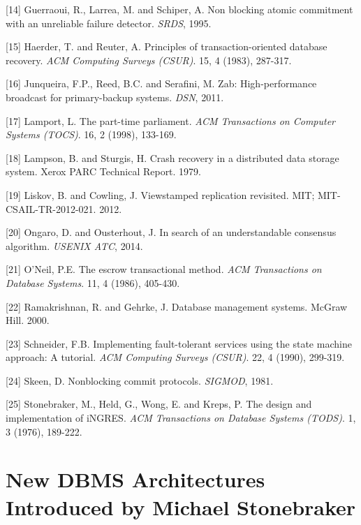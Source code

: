 \documentclass[b5paper,11pt,twoside,openright]{book}
\newcommand\Chapter[3]{
  \hypertarget{#1}{
    \chapter[#2]{#2\\{\Large #3}}\label{#1}
  }
}
\begin{document}
\leavevmode\hypertarget{ref-ac-srds}{}%
{[}14{]} Guerraoui, R., Larrea, M. and Schiper, A. Non blocking atomic
commitment with an unreliable failure detector. \emph{SRDS}, 1995.

\leavevmode\hypertarget{ref-haerder-reuter}{}%
{[}15{]} Haerder, T. and Reuter, A. Principles of transaction-oriented
database recovery. \emph{ACM Computing Surveys (CSUR)}. 15, 4 (1983),
287-317.

\leavevmode\hypertarget{ref-zab}{}%
{[}16{]} Junqueira, F.P., Reed, B.C. and Serafini, M. Zab:
High-performance broadcast for primary-backup systems. \emph{DSN}, 2011.

\leavevmode\hypertarget{ref-paxos}{}%
{[}17{]} Lamport, L. The part-time parliament. \emph{ACM Transactions on
  Computer Systems (TOCS)}. 16, 2 (1998), 133-169.

\leavevmode\hypertarget{ref-lampson-2pc}{}%
{[}18{]} Lampson, B. and Sturgis, H. Crash recovery in a distributed
data storage system. Xerox PARC Technical Report. 1979.

\leavevmode\hypertarget{ref-vrr}{}%
{[}19{]} Liskov, B. and Cowling, J. Viewstamped replication revisited.
MIT; MIT-CSAIL-TR-2012-021. 2012.

\leavevmode\hypertarget{ref-raft}{}%
{[}20{]} Ongaro, D. and Ousterhout, J. In search of an understandable
consensus algorithm. \emph{USENIX ATC}, 2014.

\leavevmode\hypertarget{ref-escrow}{}%
{[}21{]} O'Neil, P.E. The escrow transactional method. \emph{ACM
  Transactions on Database Systems}. 11, 4 (1986), 405-430.

\leavevmode\hypertarget{ref-cowbook}{}%
{[}22{]} Ramakrishnan, R. and Gehrke, J. Database management systems.
McGraw Hill. 2000.

\leavevmode\hypertarget{ref-statemachine}{}%
{[}23{]} Schneider, F.B. Implementing fault-tolerant services using the
state machine approach: A tutorial. \emph{ACM Computing Surveys (CSUR)}.
22, 4 (1990), 299-319.

\leavevmode\hypertarget{ref-3pc}{}%
{[}24{]} Skeen, D. Nonblocking commit protocols. \emph{SIGMOD}, 1981.

\leavevmode\hypertarget{ref-ingres}{}%
{[}25{]} Stonebraker, M., Held, G., Wong, E. and Kreps, P. The design
and implementation of iNGRES. \emph{ACM Transactions on Database Systems
  (TODS)}. 1, 3 (1976), 189-222.


\Chapter{ch4-newdbms}{%
New DBMS Architectures
}{%
Introduced by Michael Stonebraker
}
\end{document}
